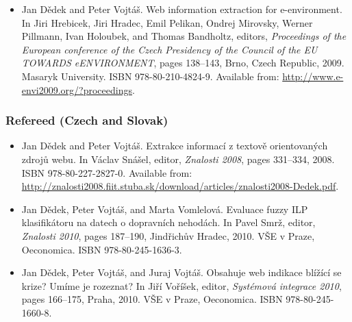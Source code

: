 \documentclass[12pt,a4paper,twoside,notitlepage]{article}
\begin{document}
\begin{itemize}
\item
Jan D{\v{e}}dek and Peter Vojt{\'{a}}{\v{s}}.
\newblock Web information extraction for e-environment.
\newblock In Jiri Hrebicek, Jiri Hradec, Emil Pelikan, Ondrej Mirovsky, Werner
  Pillmann, Ivan Holoubek, and Thomas Bandholtz, editors, {\em Proceedings of
  the European conference of the Czech Presidency of the Council of the {EU
  TOWARDS eENVIRONMENT}}, pages 138--143, Brno, Czech Republic, 2009. Masaryk
  University.
\newblock ISBN 978-80-210-4824-9.
\newblock Available from: \url{http://www.e-envi2009.org/?proceedings}.







\end{itemize}

\subsubsection*{Refereed (Czech and Slovak)}

\begin{itemize}





\item
Jan D{\v{e}}dek and Peter Vojt{\'{a}}{\v{s}}.
\newblock Extrakce informac{\'{i}} z textov{\v{e}} orientovan{\'{y}}ch
  zdrojů webu.
\newblock In V{\'{a}}clav Sn{\'{a}}{\v{s}}el, editor, {\em Znalosti 2008},
  pages 331--334, 2008.
\newblock ISBN 978-80-227-2827-0.
\newblock Available from:
  \url{http://znalosti2008.fiit.stuba.sk/download/articles/znalosti2008-Dedek.pdf}.


\item
Jan D{\v{e}}dek, Peter Vojt{\'{a}}{\v{s}}, and Marta Vomlelov{\'{a}}.
\newblock Evaluace fuzzy {ILP} klasifik{\'{a}}toru na datech o dopravn{\'{i}}ch
  nehod{\'{a}}ch.
\newblock In Pavel Smr{\v{z}}, editor, {\em Znalosti 2010}, pages 187--190,
  Jind{\v{r}}ichův Hradec, 2010. V{\v{S}}E v Praze, Oeconomica.
\newblock ISBN 978-80-245-1636-3.



\item
Jan D{\v{e}}dek, Peter Vojt{\'{a}}{\v{s}}, and Juraj Vojt{\'{a}}{\v{s}}.
\newblock Obsahuje web indikace bl\'{i}\v{z}\'{i}c\'{i} se krize? {U}m\'{i}me
  je rozeznat?
\newblock In Ji\v{r}\'{i} Vo\v{r}\'{i}\v{s}ek, editor, {\em Syst\'{e}mov\'{a}
  integrace 2010}, pages 166--175, Praha, 2010. V{\v{S}}E v Praze, Oeconomica.
\newblock ISBN 978-80-245-1660-8.


\end{itemize}
\end{document}
